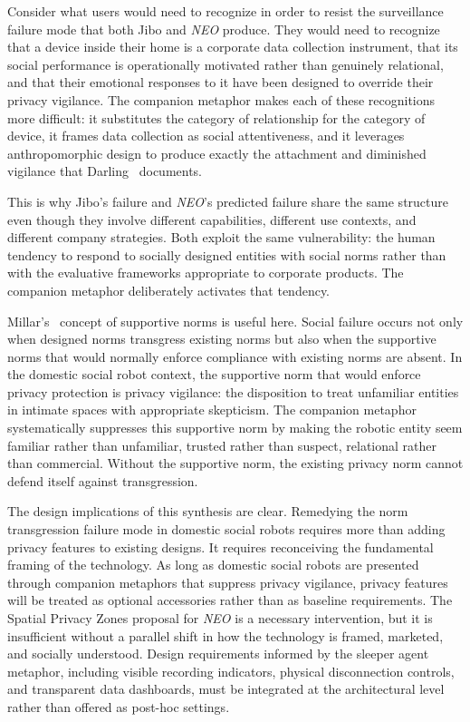\documentclass{ieee-portfolio}
\newcommand{\neo}{\textit{NEO}}
\begin{document}
Consider what users would need to recognize in order to resist the surveillance failure mode that both Jibo and \neo{} produce. They would need to recognize that a device inside their home is a corporate data collection instrument, that its social performance is operationally motivated rather than genuinely relational, and that their emotional responses to it have been designed to override their privacy vigilance. The companion metaphor makes each of these recognitions more difficult: it substitutes the category of relationship for the category of device, it frames data collection as social attentiveness, and it leverages anthropomorphic design to produce exactly the attachment and diminished vigilance that Darling~\cite{darling_whos_2015} documents.

This is why Jibo's failure and \neo{}'s predicted failure share the same structure even though they involve different capabilities, different use contexts, and different company strategies. Both exploit the same vulnerability: the human tendency to respond to socially designed entities with social norms rather than with the evaluative frameworks appropriate to corporate products. The companion metaphor deliberately activates that tendency.

Millar's~\cite{millar_social_2020} concept of supportive norms is useful here. Social failure occurs not only when designed norms transgress existing norms but also when the supportive norms that would normally enforce compliance with existing norms are absent. In the domestic social robot context, the supportive norm that would enforce privacy protection is privacy vigilance: the disposition to treat unfamiliar entities in intimate spaces with appropriate skepticism. The companion metaphor systematically suppresses this supportive norm by making the robotic entity seem familiar rather than unfamiliar, trusted rather than suspect, relational rather than commercial. Without the supportive norm, the existing privacy norm cannot defend itself against transgression.

The design implications of this synthesis are clear. Remedying the norm transgression failure mode in domestic social robots requires more than adding privacy features to existing designs. It requires reconceiving the fundamental framing of the technology. As long as domestic social robots are presented through companion metaphors that suppress privacy vigilance, privacy features will be treated as optional accessories rather than as baseline requirements. The Spatial Privacy Zones proposal for \neo{} is a necessary intervention, but it is insufficient without a parallel shift in how the technology is framed, marketed, and socially understood. Design requirements informed by the sleeper agent metaphor, including visible recording indicators, physical disconnection controls, and transparent data dashboards, must be integrated at the architectural level rather than offered as post-hoc settings.
\end{document}
